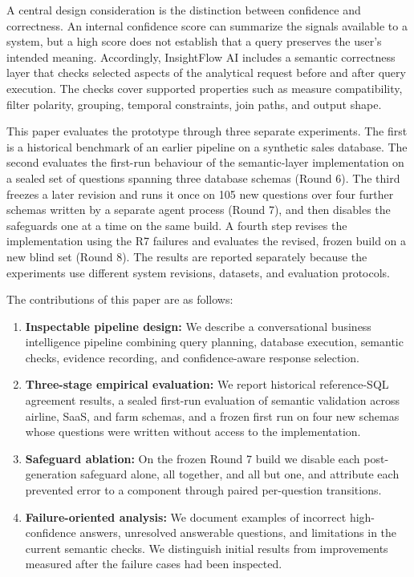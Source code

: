 \documentclass[conference]{IEEEtran}
\begin{document}
A central design consideration is the distinction between confidence and correctness. An internal confidence score can summarize the signals available to a system, but a high score does not establish that a query preserves the user's intended meaning. Accordingly, InsightFlow AI includes a semantic correctness layer that checks selected aspects of the analytical request before and after query execution. The checks cover supported properties such as measure compatibility, filter polarity, grouping, temporal constraints, join paths, and output shape.

This paper evaluates the prototype through three separate experiments. The first is a historical benchmark of an earlier pipeline on a synthetic sales database. The second evaluates the first-run behaviour of the semantic-layer implementation on a sealed set of questions spanning three database schemas (Round 6). The third freezes a later revision and runs it once on 105 new questions over four further schemas written by a separate agent process (Round 7), and then disables the safeguards one at a time on the same build. A fourth step revises the implementation using the R7 failures and evaluates the revised, frozen build on a new blind set (Round 8). The results are reported separately because the experiments use different system revisions, datasets, and evaluation protocols.

The contributions of this paper are as follows:

\begin{enumerate}
\def\labelenumi{\arabic{enumi}.}
\item
  \textbf{Inspectable pipeline design:} We describe a conversational business intelligence pipeline combining query planning, database execution, semantic checks, evidence recording, and confidence-aware response selection.
\item
  \textbf{Three-stage empirical evaluation:} We report historical reference-SQL agreement results, a sealed first-run evaluation of semantic validation across airline, SaaS, and farm schemas, and a frozen first run on four new schemas whose questions were written without access to the implementation.
\item
  \textbf{Safeguard ablation:} On the frozen Round 7 build we disable each post-generation safeguard alone, all together, and all but one, and attribute each prevented error to a component through paired per-question transitions.
\item
  \textbf{Failure-oriented analysis:} We document examples of incorrect high-confidence answers, unresolved answerable questions, and limitations in the current semantic checks. We distinguish initial results from improvements measured after the failure cases had been inspected.
\end{enumerate}
\end{document}

